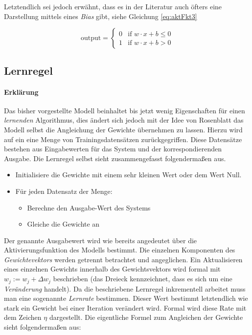 Letztendlich sei jedoch erwähnt, dass es in der Literatur auch öfters eine Darstellung mittels eines \emph{Bias} gibt, siehe Gleichung \autoref{eq:aktFkt3} \cite{dlnielsen}

\begin{equation} \label{eq:aktFkt3}
\mbox{output} =\begin{cases}
	0 & \mbox{if } w\cdot x + b \leq 0 \\
    1 & \mbox{if } w\cdot x + b > 0
  \end{cases}
\end{equation}



\subsection{Lernregel} \label{ss:lernregel}

\paragraph{Erklärung}

Das bisher vorgestellte Modell beinhaltet bis jetzt wenig Eigenschaften für einen \emph{lernenden} Algorithmus, dies ändert sich jedoch mit der Idee von Rosenblatt das Modell selbst die Angleichung der Gewichte übernehmen zu lassen. Hierzu wird auf ein eine Menge von Trainingsdatensätzen zurückgegriffen. 
Diese Datensätze bestehen aus Eingabewerten für das System und der korrespondierenden Ausgabe. Die Lernregel selbst sieht zusammengefasst folgendermaßen aus. 

\begin{minipage}{\textwidth}
\begin{itemize}
\item Initialisiere die Gewichte mit einem sehr kleinen Wert oder dem Wert Null. 
\item Für jeden Datensatz der Menge: 
\begin{itemize}
	\item Berechne den Ausgabe-Wert des Systems 
	\item Gleiche die Gewichte an 
\end{itemize}
\end{itemize}
\end{minipage}

\vspace{5 mm}

Der genannte Ausgabewert wird wie bereits angedeutet über die Aktivierungsfunktion des Modells bestimmt. Die einzelnen Komponenten des \emph{Gewichtevektors} werden getrennt betrachtet und angeglichen. Ein Aktualisieren eines einzelnen Gewichts innerhalb des Gewichtsvektors wird formal mit $w_j := w_j + \Delta w_j$ beschrieben (das Dreieck kennzeichnet, dass es sich um eine \emph{Veränderung} handelt). Da die beschriebene Lernregel inkrementell arbeitet muss man eine sogenannte \emph{Lernrate} bestimmen. Dieser Wert bestimmt letztendlich wie stark ein Gewicht bei einer Iteration verändert wird. Formal wird diese Rate mit dem Zeichen $\eta$ dargestellt. Die eigentliche Formel zum Angleichen der Gewichte sieht folgendermaßen aus: 

